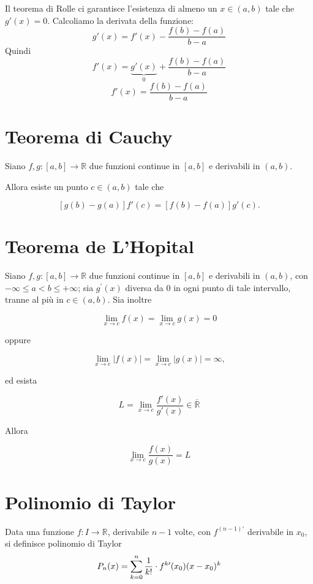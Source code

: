 Il teorema di Rolle ci garantisce l'esistenza di almeno un $x \in (a,b)$ tale che $g'(x)=0$. Calcoliamo la derivata della funzione:
\begin{equation*}
g'(x) = f'(x) - \frac{f(b)-f(a)}{b-a}
\end{equation*}
Quindi
\begin{equation*}
f'(x) = \underbrace{g'(x)}_{0} + \frac{f(b)-f(a)}{b-a}
\end{equation*}
\begin{equation*}
f'(x) = \frac{f(b)-f(a)}{b-a}
\end{equation*}

\section{Teorema di Cauchy}
Siano $f, g : [a,b] \to \mathbb{R}$ due funzioni continue in $[a,b]$ e derivabili in $(a,b)$. 

Allora esiste un punto $c\in (a,b)$ tale che

$$[g(b)-g(a)]f'(c) = [f(b) - f(a)]g'(c).$$

\section{Teorema de L'Hopital}

Siano $f, g : [a,b] \rightarrow \mathbb{R}$ due funzioni continue in $[a,b]$ e derivabili in $(a,b)$, con $-\infty \leq a < b \leq +\infty$; sia $g^{\prime}(x)$ diversa da 0 in ogni punto di tale intervallo, tranne al più in $c \in (a,b)$. Sia inoltre

$$\lim_{x\to c}{f(x)} = \lim_{x\to c}g(x) = 0$$

oppure 

$$\lim_{x\to c}{|f(x)|} = \lim_{x\to c}{|g(x)|} = \infty,$$

ed esista 

$$ L = \lim_{x \to c}{\frac{f'(x)}{g'(x)}} \in \mathbb{\bar{R}} $$

Allora

$$\lim_{x \to c}{\frac{f(x)}{g(x)}} = L$$

\section{Polinomio di Taylor}

Data una funzione $f: I\to \mathbb{R}$, derivabile $n-1$ volte, con $f^{(n-1)\prime}$ derivabile in $x_0$, si definisce polinomio di Taylor $$P_n(x)=\sum\limits_{k=0}^{n}\frac{1}{k!}\cdot f^{k\prime}(x_0)(x-x_0)^k$$


